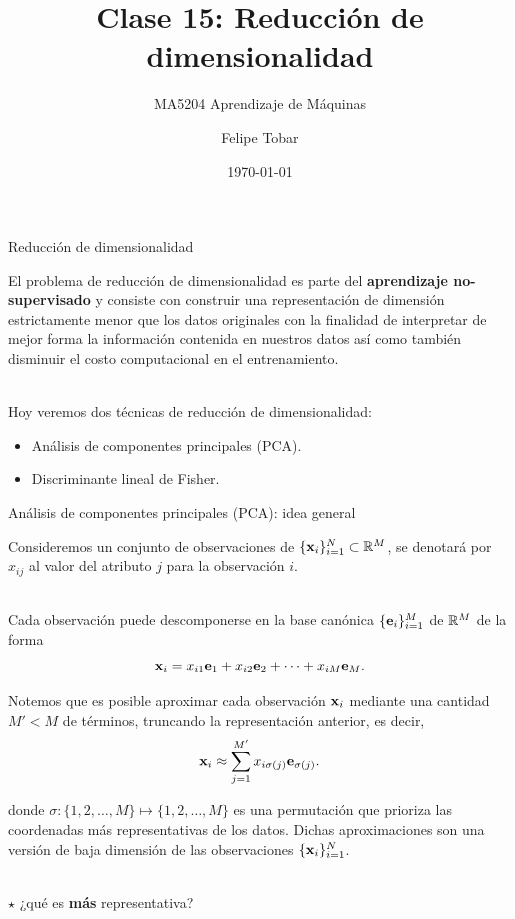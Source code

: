 \documentclass[9pt, handout]{beamer}
\title{Clase 15: Reducción de dimensionalidad}
\subtitle{MA5204 Aprendizaje de Máquinas}
\date{\today}
\author{Felipe Tobar}
\institute{Department of Mathematical Engineering \&\\ Center for Mathematical Modelling\\Universidad de Chile}
\begin{document}
\begin{frame}
  \titlepage
\end{frame}

\begin{frame}{Reducción de dimensionalidad}

El problema de reducción de dimensionalidad es parte del \textbf{aprendizaje no-supervisado} y consiste con construir una representación de dimensión estrictamente menor que los datos originales con la finalidad de interpretar de mejor forma la información contenida en nuestros datos así como también disminuir el costo computacional en el entrenamiento.\\~\ \pause

Hoy veremos dos técnicas de reducción de dimensionalidad:

\begin{itemize}
	\item Análisis de componentes principales (PCA).
	\item Discriminante lineal de Fisher.
\end{itemize}
	
\end{frame}

\begin{frame}{Análisis de componentes principales (PCA): idea general}

Consideremos un conjunto de observaciones de $\{\mathbf{x}_i\}_{i=1}^N\subset\mathbb{R}^M$, se denotará por $x_{ij}$ al valor del atributo $j$ para la observación $i$. \\~\ \pause

Cada observación puede descomponerse en la base canónica $\{\mathbf{e}_i\}_{i=1}^M$ de $\mathbb{R}^M$ de la forma 
\begin{equation*}
	\mathbf{x}_i = x_{i1}\mathbf{e}_1 +  x_{i2}\mathbf{e}_2 + \cdots + x_{iM}\mathbf{e}_M.	
\end{equation*}\pause

Notemos que es posible aproximar cada observación $\mathbf{x}_i$ mediante una cantidad $M'<M$ de términos, truncando la representación anterior, es decir,  
\begin{equation*}
	\mathbf{x}_i \approx \sum_{j=1}^{M'} x_{i\sigma(j)}\mathbf{e}_{\sigma(j)}.
\end{equation*}

donde $\sigma:\{1,2,\ldots,M\}\mapsto\{1,2,\ldots,M\}$ es una permutación que prioriza las coordenadas más representativas de los datos. Dichas aproximaciones son una versión de baja dimensión de las observaciones $\{\mathbf{x}_i\}_{i=1}^N$.\\~\ 

$\star$ ¿qué es \textbf{más} representativa?
\end{frame}
\end{document}
